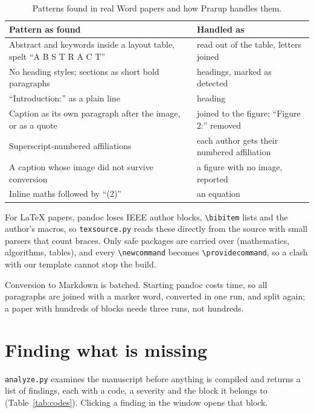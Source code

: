 \documentclass[11pt,a4paper,oneside,openany]{book}
\newcommand{\code}[1]{\texttt{#1}}
\begin{document}
\begin{table}[htbp]
\centering\small
\caption{Patterns found in real Word papers and how Prarup handles them.}
\label{tab:patterns}
\begin{tabularx}{\linewidth}{>{\raggedright\arraybackslash}X >{\raggedright\arraybackslash}X}
\toprule
Pattern as found & Handled as\\
\midrule
Abstract and keywords inside a layout table, spelt ``A B S T R A C T'' & read out of the table, letters joined\\
No heading styles; sections as short bold paragraphs & headings, marked as detected\\
``Introduction:'' as a plain line & heading\\
Caption as its own paragraph after the image, or as a quote & joined to the figure; ``Figure 2:'' removed\\
Superscript-numbered affiliations & each author gets their numbered affiliation\\
A caption whose image did not survive conversion & a figure with no image, reported\\
Inline maths followed by ``(2)'' & an equation\\
\bottomrule
\end{tabularx}
\end{table}

For \LaTeX{} papers, pandoc loses IEEE author blocks, \code{\textbackslash bibitem} lists and the author's
macros, so \code{texsource.py} reads these directly from the source with small parsers that count braces.
Only safe packages are carried over (mathematics, algorithms, tables), and every \code{\textbackslash newcommand}
becomes \code{\textbackslash providecommand}, so a clash with our template cannot stop the build.

Conversion to Markdown is batched. Starting pandoc costs time, so all paragraphs are joined with a marker
word, converted in one run, and split again; a paper with hundreds of blocks needs three runs, not hundreds.

\section{Finding what is missing}
\code{analyze.py} examines the manuscript before anything is compiled and returns a list of findings, each
with a code, a severity and the block it belongs to (Table~\ref{tab:codes}). Clicking a finding in the
window opens that block.
\end{document}
